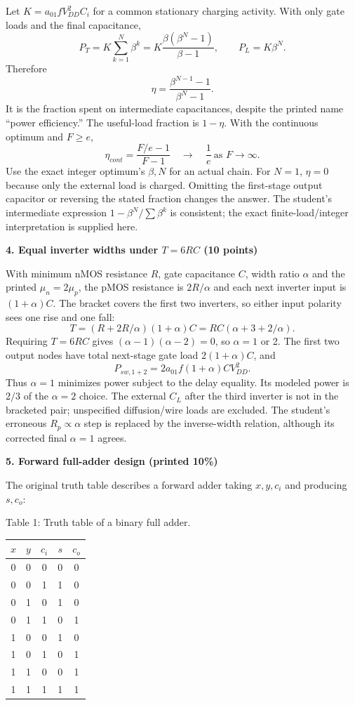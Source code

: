 \documentclass[10pt]{article}
\newcommand{\qheading}[1]{\par\medskip\textbf{#1}\par}
\begin{document}
Let $K=a_{01}fV_{DD}^2C_i$ for a common stationary charging activity. With only gate loads and the final capacitance,
\[P_T=K\sum_{k=1}^N\beta^k=K\frac{\beta(\beta^N-1)}{\beta-1},\qquad P_L=K\beta^N.\]
Therefore
\[\boxed{\eta=\frac{\beta^{N-1}-1}{\beta^N-1}.}\]
It is the fraction spent on intermediate capacitances, despite the printed name ``power efficiency.'' The useful-load fraction is $1-\eta$. With the continuous optimum and $F\ge e$,
\[\eta_{cont}=\frac{F/e-1}{F-1}\quad\longrightarrow\quad\frac1e\ \text{as }F\to\infty.\]
Use the exact integer optimum's $\beta,N$ for an actual chain. For $N=1$, $\eta=0$ because only the external load is charged. Omitting the first-stage output capacitor or reversing the stated fraction changes the answer. The student's intermediate expression $1-\beta^N/\sum\beta^k$ is consistent; the exact finite-load/integer interpretation is supplied here.
\qheading{4. Equal inverter widths under $T=6RC$ (10 points)}
With minimum nMOS resistance $R$, gate capacitance $C$, width ratio $\alpha$ and the printed $\mu_n=2\mu_p$, the pMOS resistance is $2R/\alpha$ and each next inverter input is $(1+\alpha)C$. The bracket covers the first two inverters, so either input polarity sees one rise and one fall:
\[T=(R+2R/\alpha)(1+\alpha)C=RC(\alpha+3+2/\alpha).\]
Requiring $T=6RC$ gives $(\alpha-1)(\alpha-2)=0$, so $\alpha=1$ or 2. The first two output nodes have total next-stage gate load $2(1+\alpha)C$, and
\[P_{sw,1+2}=2a_{01}f(1+\alpha)CV_{DD}^2.\]
Thus $\boxed{\alpha=1}$ minimizes power subject to the delay equality. Its modeled power is $2/3$ of the $\alpha=2$ choice. The external $C_L$ after the third inverter is not in the bracketed pair; unspecified diffusion/wire loads are excluded. The student's erroneous $R_p\propto\alpha$ step is replaced by the inverse-width relation, although its corrected final $\alpha=1$ agrees.
\newpage
\qheading{5. Forward full-adder design (printed 10\%)}
The original truth table describes a forward adder taking $x,y,c_i$ and producing $s,c_o$:
\begin{center}\small Table 1: Truth table of a binary full adder.\\
\begin{tabular}{ccccc}\toprule$x$&$y$&$c_i$&$s$&$c_o$\\\midrule
0&0&0&0&0\\0&0&1&1&0\\0&1&0&1&0\\0&1&1&0&1\\
1&0&0&1&0\\1&0&1&0&1\\1&1&0&0&1\\1&1&1&1&1\\\bottomrule\end{tabular}\end{center}
\end{document}
